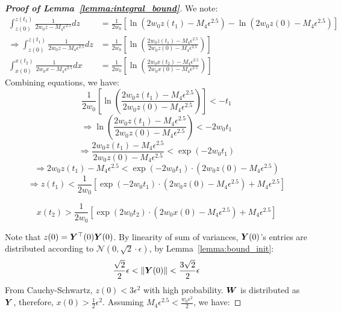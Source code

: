 \begin{proof}[\textbf{Proof of Lemma~\ref{lemma:integral_bound}}]
We note:
\begin{align}
   \int_{z(0)}^{z(t_1)} \frac{1}{2w_0 z -M_4 \epsilon^{2.5}} dz &= \frac{1}{2w_0} [\ln(2w_0 z(t_1)  -M_4 \epsilon^{2.5}) -\ln(2w_0 z(0) -M_4 \epsilon^{2.5} )] \\
   \Rightarrow\int_{z(0)}^{z(t_1)} \frac{1}{2w_0 z -M_4 \epsilon^{2.5}} dz &= \frac{1}{2w_0} \left[ \ln \left( \frac{2w_0 z(t_1) -M_4 \epsilon^{2.5} }{2w_0 z(0) -M_4 \epsilon^{2.5} }\right) \right] \\
   \int_{x(0)}^{x(t_2)} \frac{1}{2w_0 x -M_4 \epsilon^{2.5}} dx &= \frac{1}{2w_0} \left[ \ln \left( \frac{2w_0 x(t_2) -M_4 \epsilon^{2.5} }{2w_0 x(0) -M_4 \epsilon^{2.5} }\right) \right] 
\end{align}
Combining equations, we have:
\begin{equation}
   \frac{1}{2w_0} \left[ \ln \left( \frac{2w_0 z(t_1) -M_4 \epsilon^{2.5} }{2w_0 z(0) -M_4 \epsilon^{2.5} } \right) \right]  < -t_1
\end{equation}
\begin{equation}
   \Rightarrow \ln \left( \frac{2w_0 z(t_1) -M_4 \epsilon^{2.5} }{2w_0 z(0) -M_4 \epsilon^{2.5} } \right) < -2w_0t_1
\end{equation}
\begin{equation}
   \Rightarrow \frac{2w_0 z(t_1) -M_4 \epsilon^{2.5} }{2w_0 z(0) -M_4 \epsilon^{2.5} } < \exp(-2w_0t_1)
\end{equation}
\begin{equation}
   \Rightarrow 2w_0 z(t_1) -M_4 \epsilon^{2.5} < \exp(-2w_0t_1) \cdot \left(2w_0 z(0) -M_4 \epsilon^{2.5} \right)
\end{equation}
\begin{equation}
   \Rightarrow z(t_1)  < \frac{1}{2w_0}\left[\exp(-2w_0t_1) \cdot (2w_0 z(0) -M_4 \epsilon^{2.5}) + M_4 \epsilon^{2.5} \right]
\end{equation}

\begin{equation}
    x(t_2)  > \frac{1}{2w_0}\left[\exp(2w_0t_2) \cdot (2w_0 x(0) -M_4 \epsilon^{2.5}) + M_4 \epsilon^{2.5} \right]
\end{equation}

Note that $z(0) = {\bm{Y}}^\top(0){\bm{Y}}(0)$. 
By linearity of sum of variances, ${\bm{Y}}(0)$'s entries are distributed according to $\mathcal{N}(0,\sqrt{2}\cdot \epsilon)$,  by Lemma~\ref{lemma:bound_init}:
\begin{equation}
    \frac{\sqrt{2}}{2}\epsilon<\|{\bm{Y}}(0)\|<\frac{3\sqrt{2}}{2}\epsilon
\end{equation}
From Cauchy-Schwartz, $z(0)<3\epsilon^2$ with high probability.
${\bm{W}}$ is distributed as ${\bm{Y}}$, therefore, $x(0)> \frac{1}{2}\epsilon^2$.
Assuming $M_4 \epsilon^{2.5} < \frac{w_0 \epsilon^2}{2}$, we have:


\end{proof}
